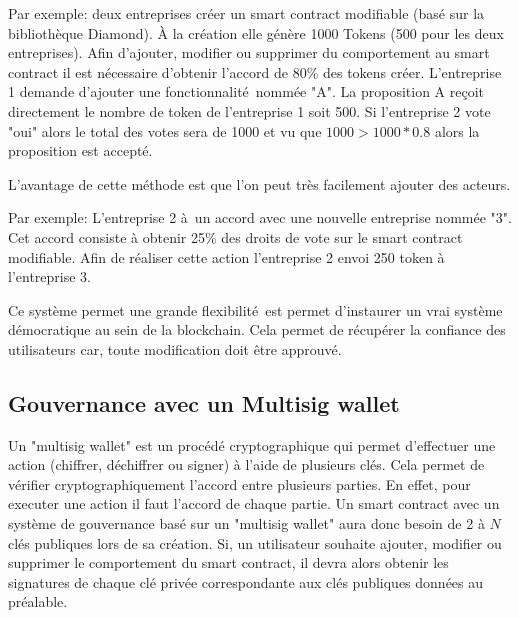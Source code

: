 Par exemple: deux entreprises créer un smart contract modifiable (basé sur la bibliothèque Diamond). À la création
elle génère 1000 Tokens (500 pour les deux entreprises). Afin d'ajouter, modifier ou supprimer 
du comportement au smart contract il est nécessaire d'obtenir l'accord de 80\% des tokens créer. 
L'entreprise 1 demande d'ajouter une fonctionnalité nommée "A". La proposition A reçoit directement le nombre de token
de l'entreprise 1 soit 500. Si l'entreprise 2 vote "oui" alors le total des votes sera de 1000 et vu que $1000 > 1000*0.8$
alors la proposition est accepté.

L'avantage de cette méthode est que l'on peut très facilement ajouter des acteurs.

Par exemple: L'entreprise 2 à un accord avec une nouvelle entreprise nommée "3". Cet accord consiste à obtenir
25\% des droits de vote sur le smart contract modifiable. Afin de réaliser cette action l'entreprise 2 envoi 250
token à l'entreprise 3.


Ce système permet une grande flexibilité est permet d'instaurer un vrai système démocratique au sein de la blockchain.
Cela permet de récupérer la confiance des utilisateurs car, toute modification doit être approuvé.

\subsection{Gouvernance avec un Multisig wallet}

Un "multisig wallet" est un procédé cryptographique qui permet d'effectuer une action (chiffrer, déchiffrer ou signer)
à l'aide de plusieurs clés. Cela permet de vérifier cryptographiquement l'accord entre plusieurs parties. En effet, pour
executer une action il faut l'accord de chaque partie. Un smart contract 
avec un système de gouvernance basé sur un "multisig wallet" aura donc besoin de 2 à $N$ clés publiques lors de sa création. Si, 
un utilisateur souhaite ajouter, modifier ou supprimer le comportement du smart contract, il devra alors obtenir les signatures
de chaque clé privée correspondante aux clés publiques données au préalable.
